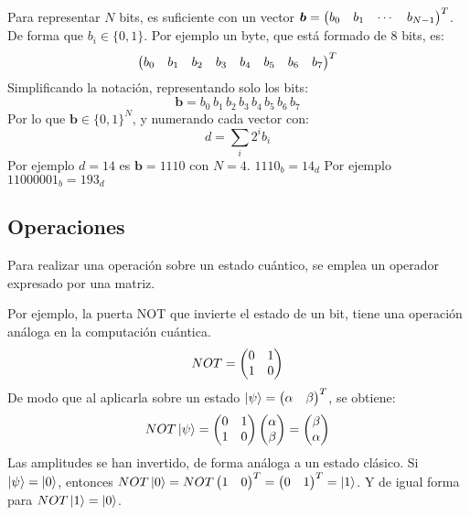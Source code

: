 Para representar $N$ bits, es suficiente con un vector $\boldsymbol{b} = 
\begin{pmatrix} b_0 & b_1 & \cdots & b_{N-1}  \end{pmatrix}^T$. De forma que $b_i \in \{0,1\}$. Por 
ejemplo un byte, que está formado de 8 bits, es:
$$\begin{pmatrix} b_0 & b_1 & b_2 & b_3 & b_4 & b_5 & b_6 & b_7 \end{pmatrix}^T$$
Simplificando la notación, representando solo los bits:
$$\boldsymbol{b} = b_0 \, b_1 \, b_2 \, b_3 \, b_4 \, b_5 \, b_6 \, b_7$$
Por lo que $\boldsymbol{b} \in \{0,1\}^N$, y numerando cada vector con:
$$d = \sum_i 2^i b_i$$
Por ejemplo $d=14$ es $\boldsymbol{b} = 1110$ con $N=4$. $1110_b = 14_d$
Por ejemplo $11000001_b = 193_d$


\subsection{Operaciones}



Para realizar una operación sobre un estado cuántico, se emplea un operador 
expresado por una matriz.

Por ejemplo, la puerta NOT que invierte el estado de un bit, tiene una operación 
análoga en la computación cuántica.
%
$$ NOT = \begin{pmatrix} 0 & 1 \\ 1 & 0 \end{pmatrix} $$
%
De modo que al aplicarla sobre un estado $\ket{\psi} = \begin{pmatrix} \alpha & \beta \end{pmatrix}^T$, 
se obtiene:
%
$$ NOT \ket{\psi} = \begin{pmatrix} 0 & 1 \\ 1 & 0 \end{pmatrix} \begin{pmatrix} \alpha \\ \beta \end{pmatrix} = \begin{pmatrix} \beta \\ 
\alpha \end{pmatrix} $$
%
Las amplitudes se han invertido, de forma análoga a un estado clásico. Si 
$\ket{\psi} = \ket{0}$, entonces $NOT\ket{0} = NOT \begin{pmatrix} 1 & 0 \end{pmatrix}^T = \begin{pmatrix} 0 & 
1 \end{pmatrix}^T = \ket{1}$. Y de igual forma para $NOT \ket{1} = \ket{0}$.
